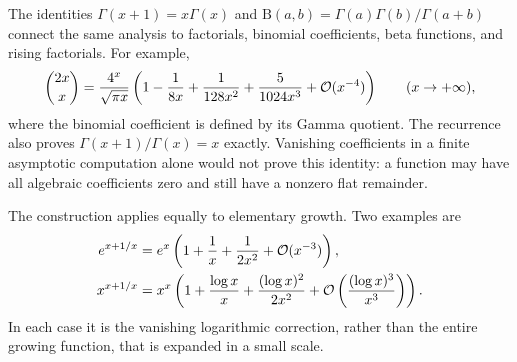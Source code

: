The identities $\Gamma(x+1)=x\Gamma(x)$ and
$\mathrm B(a,b)=\Gamma(a)\Gamma(b)/\Gamma(a+b)$ connect the same
analysis to factorials, binomial coefficients, beta functions, and
rising factorials. For example,
\begin{equation}
 \binom{2x}{x}=\frac{4^x}{\sqrt{\pi x}}
 \left(1-\frac1{8x}+\frac1{128x^2}
       +\frac5{1024x^3}+\mathcal O(x^{-4})\right)
 \qquad(x\to+\infty),
\end{equation}
where the binomial coefficient is defined by its Gamma quotient.
The recurrence also proves $\Gamma(x+1)/\Gamma(x)=x$ exactly.
Vanishing coefficients in a finite asymptotic computation alone would
not prove this identity: a function may have all algebraic coefficients
zero and still have a nonzero flat remainder.

The construction applies equally to elementary growth. Two examples are
\begin{align}
 e^{x+1/x}
   &=e^x\left(1+\frac1x+\frac1{2x^2}+\mathcal O(x^{-3})\right),\\
 x^{x+1/x}
   &=x^x\left(1+\frac{\log x}{x}
             +\frac{(\log x)^2}{2x^2}
             +\mathcal O\left(\frac{(\log x)^3}{x^3}\right)\right).
\end{align}
In each case it is the vanishing logarithmic correction, rather than
the entire growing function, that is expanded in a small scale.
